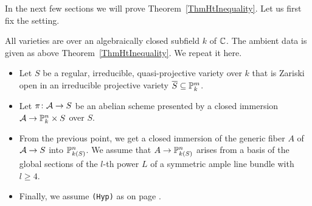 
In the next few sections we will prove Theorem~\ref{ThmHtInequality}.
Let us first fix  the setting.

All varieties are over an algebraically closed subfield $k$ of ${\mathbb{C}}$.
The ambient data is given as above Theorem~\ref{ThmHtInequality}. We
repeat it here.
\begin{itemize}
  \item Let $S$ be a regular, irreducible, quasi-projective variety over  $k$
  that is Zariski open in an irreducible projective variety
  $\overline{S}\subseteq {\mathbb{P}}_k^m$.
  \item Let $\pi\colon \mathcal{A}\rightarrow S$ be an abelian scheme
     presented by a closed immersion $\mathcal{A}\rightarrow{\mathbb{P}}_k^n\times S$ over
     $S$. %
  \item
    From the previous point, we get a closed immersion of the generic
    fiber $A$ of $\mathcal{A}\rightarrow S$  into  ${\mathbb{P}}_{k(S)}^n$.
    We assume that $A\rightarrow {\mathbb{P}}_{k(S)}^n$  
    arises from a basis of the global sections of 
    the $l$-th power $L$ of a symmetric ample
    line bundle with $l\ge 4$. 
  \item
    Finally, we assume \texttt{(Hyp)} as on page \pageref{def:hyp}.
\end{itemize}

